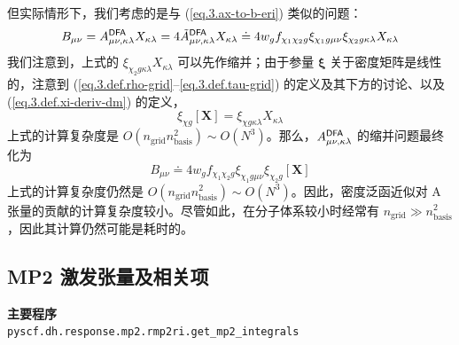 但实际情形下，我们考虑的是与 (\ref{eq.3.ax-to-b-eri}) 类似的问题：
\begin{equation*}
    B_{\mu \nu} = {A}_{\mu \nu, \kappa \lambda}^{\textsf{DFA}} X_{\kappa \lambda} = 4 \tilde{A}_{\mu \nu, \kappa \lambda}^{\textsf{DFA}} X_{\kappa \lambda} \doteq 4 w_g f_{\chi_1 \chi_2 g} \xi_{\chi_1 g \mu \nu} \xi_{\chi_2 g \kappa \lambda} X_{\kappa \lambda}
\end{equation*}
我们注意到，上式的 $\xi_{\chi_2 g \kappa \lambda} X_{\kappa \lambda}$ 可以先作缩并；由于参量 $\bm{\xi}$ 关于密度矩阵是线性的，注意到 (\ref{eq.3.def.rho-grid}--\ref{eq.3.def.tau-grid}) 的定义及其下方的讨论、以及 (\ref{eq.3.def.xi-deriv-dm}) 的定义，
\begin{equation}
    \label{eq.3.xi-by-density}
    \xi_{\chi g} [\mathbf{X}] = \xi_{\chi g \kappa \lambda} X_{\kappa \lambda}
\end{equation}
上式的计算复杂度是 $O(n_\mathrm{grid} n_\mathrm{basis}^2) \sim O(N^3)$。那么，${A}_{\mu \nu, \kappa \lambda}^{\textsf{DFA}}$ 的缩并问题最终化为
\begin{equation}
    \label{eq.3.a-tensor-dfa-contraction}
    B_{\mu \nu} \doteq 4 w_g f_{\chi_1 \chi_2 g} \xi_{\chi_1 g \mu \nu} \xi_{\chi_2 g} [\mathbf{X}]
\end{equation}
上式的计算复杂度仍然是 $O(n_\mathrm{grid} n_\mathrm{basis}^2) \sim O(N^3)$。因此，密度泛函近似对 A 张量的贡献的计算复杂度较小。尽管如此，在分子体系较小时经常有 $n_\mathrm{grid} \gg n_\mathrm{basis}^2$，因此其计算仍然可能是耗时的。

\subsection{MP2 激发张量及相关项}
\label{sec.3.program-mp2-amplitude}

\begin{tcolorbox}
    \textbf{主要程序}\\
    \verb|pyscf.dh.response.mp2.rmp2ri.get_mp2_integrals|
\end{tcolorbox}

